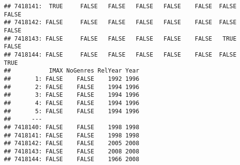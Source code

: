 \documentclass[
]{article}
\newenvironment{Shaded}{\begin{snugshade}}{\end{snugshade}}
\newcommand{\CommentTok}[1]{\textcolor[rgb]{0.56,0.35,0.01}{\textit{#1}}}
\newcommand{\ControlFlowTok}[1]{\textcolor[rgb]{0.13,0.29,0.53}{\textbf{#1}}}
\newcommand{\DataTypeTok}[1]{\textcolor[rgb]{0.13,0.29,0.53}{#1}}
\newcommand{\DecValTok}[1]{\textcolor[rgb]{0.00,0.00,0.81}{#1}}
\newcommand{\KeywordTok}[1]{\textcolor[rgb]{0.13,0.29,0.53}{\textbf{#1}}}
\newcommand{\NormalTok}[1]{#1}
\newcommand{\OperatorTok}[1]{\textcolor[rgb]{0.81,0.36,0.00}{\textbf{#1}}}
\newcommand{\OtherTok}[1]{\textcolor[rgb]{0.56,0.35,0.01}{#1}}
\newcommand{\StringTok}[1]{\textcolor[rgb]{0.31,0.60,0.02}{#1}}
\begin{document}
\begin{verbatim}
## 7418141:  TRUE     FALSE   FALSE   FALSE   FALSE    FALSE  FALSE       FALSE
## 7418142: FALSE     FALSE   FALSE   FALSE   FALSE    FALSE  FALSE       FALSE
## 7418143: FALSE     FALSE   FALSE   FALSE   FALSE    FALSE   TRUE       FALSE
## 7418144: FALSE     FALSE   FALSE   FALSE   FALSE    FALSE  FALSE        TRUE
##           IMAX NoGenres RelYear Year
##       1: FALSE    FALSE    1992 1996
##       2: FALSE    FALSE    1994 1996
##       3: FALSE    FALSE    1994 1996
##       4: FALSE    FALSE    1994 1996
##       5: FALSE    FALSE    1994 1996
##      ---                            
## 7418140: FALSE    FALSE    1998 1998
## 7418141: FALSE    FALSE    1998 1998
## 7418142: FALSE    FALSE    2005 2008
## 7418143: FALSE    FALSE    2008 2008
## 7418144: FALSE    FALSE    1966 2008
\end{verbatim}

\begin{Shaded}
\end{Shaded}
\end{document}
